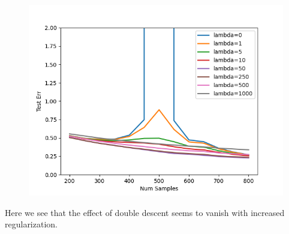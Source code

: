 
\begin{answer}
\begin{figure}[H]
    \centering
    \includegraphics[width = 15cm]{doubledescent/reg.png}
\end{figure}
Here we see that the effect of double descent seems to vanish with increased regularization.
\end{answer}
